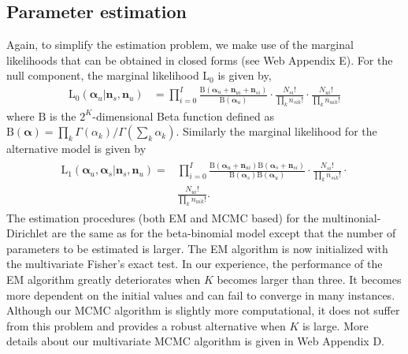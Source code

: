 \documentclass[useAMS,referee,usenatbib]{biom}
\begin{document}
\subsection{Parameter estimation}
Again, to simplify the estimation problem, we make use of the marginal likelihoods that can be obtained in closed forms (see Web Appendix E). For the null component, the marginal likelihood $\mathrm{L}_0$ is given by,
\begin{align*}
\mathrm{L}_0(\boldsymbol{\alpha}_u|\mathbf{n}_s,\mathbf{n}_u) &= \prod_{i=0}^I\frac{ \mathrm{B}(\boldsymbol{\alpha}_{u}+\mathbf{n}_{ui}+\mathbf{n}_{si})}{\mathrm{B}(\boldsymbol{\alpha}_u)} \cdot \frac{N_{si}!}{\prod_k n_{sik}!} \cdot \frac{N_{ui}!}{\prod_k n_{uik}!}
\end{align*}
where $\mathrm{B}$ is the $2^K$-dimensional Beta function defined as $\mathrm{B}(\boldsymbol{\alpha})=\prod_k\Gamma(\alpha_k)/\Gamma(\sum_k\alpha_k)$. Similarly the marginal likelihood for the alternative model is given by 
\begin{align*}
\begin{split}
\mathrm{L}_1(\boldsymbol{\alpha}_u,\boldsymbol{\alpha}_s|\mathbf{n}_s,\mathbf{n}_u) =& \prod_{i=0}^I\frac{\mathrm{B}(\boldsymbol{\alpha}_{u}+\mathbf{n}_{ui}) \mathrm{B}(\boldsymbol{\alpha}_{s}+\mathbf{n}_{si})}{\mathrm{B}(\boldsymbol{\alpha}_s)\mathrm{B}(\boldsymbol{\alpha}_u)} \cdot \frac{N_{si}!}{\prod_k n_{sik}!} \cdot \\ &\frac{N_{ui}!}{\prod_k n_{uik}!}.%
\end{split}
\end{align*}
The estimation procedures (both EM and MCMC based) for the multinonial-Dirichlet are the same as for the beta-binomial model except that the number of parameters to be estimated is larger. The EM algorithm is now initialized with the multivariate Fisher's exact test. In our experience, the performance of the EM algorithm greatly deteriorates when $K$ becomes larger than three. It becomes more dependent on the initial values and can fail to converge in many instances. Although our MCMC algorithm is slightly more computational, it does not suffer from this problem and provides a robust alternative when $K$ is large. More details about our multivariate MCMC algorithm is given in Web Appendix D. 
\end{document}
